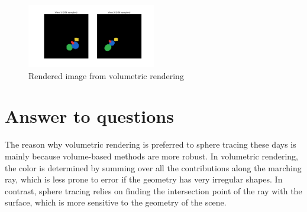 \documentclass[12pt]{article}
\begin{document}
\begin{figure}[H]
\centering
\includegraphics[width=0.5\textwidth]{volume_rendering.png}
\caption{Rendered image from volumetric rendering}
\end{figure}



\section{Answer to questions}
The reason why volumetric rendering is preferred to sphere tracing these days is mainly because volume-based methods are more robust. In volumetric rendering, the color is determined by summing over all the contributions along the marching ray, which is less prone to error if the geometry has very irregular shapes. In contrast, sphere tracing relies on finding the intersection point of the ray with the surface, which is more sensitive to the geometry of the scene. 
\end{document}
